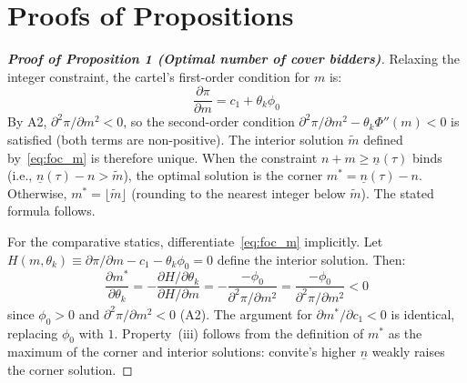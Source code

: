
\section{Proofs of Propositions}\label{app:proofs}

\label{prop:optimal_m}
\label{prop:regime1}
\label{prop:regime2}
\label{prop:market_selection}
\label{eq:cover_above}
\label{eq:cross_deriv}

\begin{proof}[\textbf{Proof of Proposition 1 (Optimal number of cover bidders)}]
Relaxing the integer constraint, the cartel's first-order condition
for $m$ is:
\begin{equation}
  \frac{\partial \pi}{\partial m} = c_1 + \theta_k \phi_0
  \label{eq:foc_m}
\end{equation}
By A2, $\partial^2 \pi / \partial m^2 < 0$, so the second-order
condition $\partial^2 \pi / \partial m^2 - \theta_k \Phi''(m) < 0$
is satisfied (both terms are non-positive). The interior solution
$\tilde{m}$ defined by~\eqref{eq:foc_m} is therefore unique. When
the constraint $n + m \geq \underline{n}(\tau)$ binds (i.e.,
$\underline{n}(\tau) - n > \tilde{m}$), the optimal solution is
the corner $m^* = \underline{n}(\tau) - n$. Otherwise,
$m^* = \lfloor \tilde{m} \rfloor$ (rounding to the nearest integer
below $\tilde{m}$). The stated formula follows.

For the comparative statics, differentiate~\eqref{eq:foc_m} implicitly.
Let $H(m, \theta_k) \equiv \partial \pi / \partial m - c_1 -
\theta_k \phi_0 = 0$ define the interior solution. Then:
\[
  \frac{\partial m^*}{\partial \theta_k} =
  -\frac{\partial H / \partial \theta_k}{\partial H / \partial m}
  = -\frac{-\phi_0}{\partial^2 \pi / \partial m^2}
  = \frac{-\phi_0}{\partial^2 \pi / \partial m^2} < 0
\]
since $\phi_0 > 0$ and $\partial^2 \pi / \partial m^2 < 0$ (A2).
The argument for $\partial m^* / \partial c_1 < 0$ is identical,
replacing $\phi_0$ with $1$. Property~(iii) follows from the
definition of $m^*$ as the maximum of the corner and interior
solutions: convite's higher $\underline{n}$ weakly raises the corner
solution.
\end{proof}

